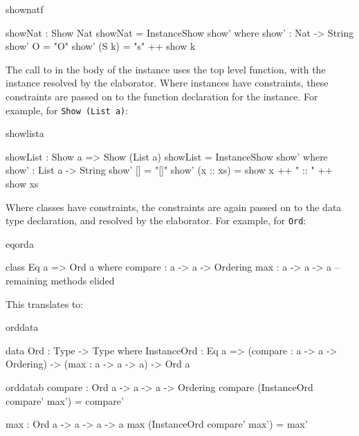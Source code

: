 \begin{SaveVerbatim}{shownatf}

showNat : Show Nat
showNat = InstanceShow show' where
    show' : Nat -> String
    show' O = "O"
    show' (S k) = "s" ++ show k

\end{SaveVerbatim}

The call to  in the body of the instance uses the top level 
function, with the instance resolved by the elaborator.
Where instances have constraints, these constraints are passed on to
the function declaration for the instance. For example, for \texttt{Show (List a)}:

\begin{SaveVerbatim}{showlista}

showList : Show a => Show (List a)
showList = InstanceShow show' where
    show' : List a -> String
    show' []        = "[]"
    show' (x :: xs) = show x ++ " :: " ++ show xs

\end{SaveVerbatim}

\noindent
Where classes have constraints, the
constraints are again passed on to the data type declaration, and resolved by the
elaborator. For example, for \texttt{Ord}:

\begin{SaveVerbatim}{eqorda}

class Eq a => Ord a where
    compare : a -> a -> Ordering
    max : a -> a -> a
    -- remaining methods elided

\end{SaveVerbatim}

\noindent
This translates to:

\begin{SaveVerbatim}{orddata}

data Ord : Type -> Type where
    InstanceOrd : Eq a => (compare : a -> a -> Ordering) -> 
                          (max : a -> a -> a) ->  Ord a 

\end{SaveVerbatim}

\begin{SaveVerbatim}{orddatab}
compare : Ord a -> a -> a -> Ordering
compare (InstanceOrd compare' max') = compare'

max : Ord a -> a -> a -> a
max (InstanceOrd compare' max') = max'

\end{SaveVerbatim}

